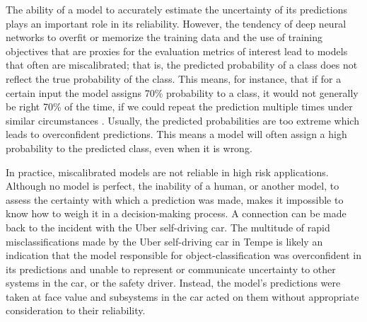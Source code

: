 The ability of a model to accurately estimate the uncertainty of its predictions plays an important role in its reliability. However, the tendency of deep neural networks to overfit or memorize the training data \cite{arpit_closer_2017, burg_memorization_2021} and the use of training objectives that are proxies for the evaluation metrics of interest lead to models that often are miscalibrated; that is, the predicted probability of a class does not reflect the true probability of the class. This means, for instance, that if for a certain input the model assigns 70\% probability to a class, it would not generally be right 70\% of the time, if we could repeat the prediction multiple times under similar circumstances \cite{guo_calibration_2017, kull_temperature_2019}. Usually, the predicted probabilities are too extreme which leads to overconfident predictions. This means a model will often assign a high probability to the predicted class, even when it is wrong. 

In practice, miscalibrated models are not reliable in high risk applications. Although no model is perfect, the inability of a human, or another model, to assess the certainty with which a prediction was made, makes it impossible to know how to weigh it in a decision-making process. 
A connection can be made back to the incident with the Uber self-driving car. The multitude of rapid misclassifications made by the Uber self-driving car in Tempe is likely an indication that the model responsible for object-classification was overconfident in its predictions and unable to represent or communicate uncertainty to other systems in the car, or the safety driver. Instead, the model's predictions were taken at face value and subsystems in the car acted on them without appropriate consideration to their reliability.



